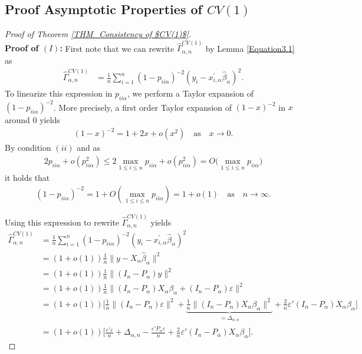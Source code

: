 \documentclass[Research_Module_ES.tex]{subfiles}
\begin{document}
\subsection{Proof Asymptotic Properties of $CV(1)$}
\begin{proof}[Proof of Theorem \ref{THM_Consistency of $CV(1)$}]~\\
	\textbf{Proof of $(I)$:} First note that we can rewrite $\hat{\Gamma}_{\alpha,n}^{CV(1)}$  by Lemma \ref{Equation3.1} as 
	\begin{align*}
	\hat{\Gamma}_{\alpha,n}^{CV(1)} &= \frac{1}{n}\sum_{i=1}^n (1- p_{ii\alpha})^{-2}(y_i-x_{i,\alpha}^\prime\hat{\beta}_\alpha)^2.
	\end{align*}
	To linearize this expression in $p_{ii\alpha}$, we perform a Taylor expansion of $(1-p_{ii\alpha})^{-2}$.
	More precisely, a first order Taylor expansion of $(1-x)^{-2}$ in $x$ around $0$ yields 
	\begin{align}
	(1- x)^{-2} = 1+ 2 x + o(x^2) \quad \textrm{as} \quad x\to 0 .\label{proof_CV(1)_1}
	\end{align}
	By condition $(ii)$ and as
	\begin{align*}
	2p_{ii\alpha} + o(p_{ii\alpha}^2) 
	\le 2 \max_{1\le i \le n} p_{ii\alpha} +  o(p_{ii\alpha}^2) 
	= O\bigl(\max _{1\le i \le n} p_{ii\alpha}\bigr)
	\end{align*}
	it holds that 
	\begin{align*}
	(1- p_{ii\alpha})^{-2} = 1+ O(\max _{1\le i \le n} p_{ii\alpha}) 
	= 1 +o(1) \quad \textrm{as} \quad n \to \infty. 
	\end{align*}
	
	Using this expression to rewrite $\hat{\Gamma}_{\alpha,n}^{CV(1)}$ yields
	\begin{align}
	\hat{\Gamma}_{\alpha,n}^{CV(1)} &= \frac{1}{n}\sum_{i=1}^n (1- p_{ii\alpha})^{-2}(y_i-x_{i,\alpha}^\prime\hat{\beta}_\alpha)^2\nonumber\\
	&= (1+o(1))\frac{1}{n}\lVert y-X_{\alpha}\hat{\beta}_\alpha\rVert^2\nonumber\\
	&= (1+o(1))\frac{1}{n}\lVert (I_n-P_\alpha) y\rVert^2\nonumber\\
	&= (1+o(1))\frac{1}{n}\lVert (I_n-P_\alpha) X_\alpha\beta_\alpha +(I_n-P_\alpha)\varepsilon \rVert^2\nonumber\\
	&= (1+o(1))\biggl[\frac{1}{n}\lVert(I_n-P_\alpha)\varepsilon \rVert^2+ \underbrace{\frac{1}{n}\lVert (I_n-P_\alpha) X_\alpha\beta_\alpha\rVert^2}_{=\Delta_{\alpha,n}} +\frac{2}{n}\varepsilon'(I_n-P_\alpha) X_\alpha\beta_\alpha\biggr]\nonumber\\
	&= (1+o(1)) \biggl[\frac{\varepsilon'\varepsilon}{n} + \Delta_{\alpha,n} - \frac{\varepsilon'P_\alpha\varepsilon}{n} +\frac{2}{n}\varepsilon'(I_n-P_\alpha) X_\alpha\beta_\alpha\biggr]. \label{proof_CV(1)_2}
	\end{align}
	

\end{proof}
\end{document}
